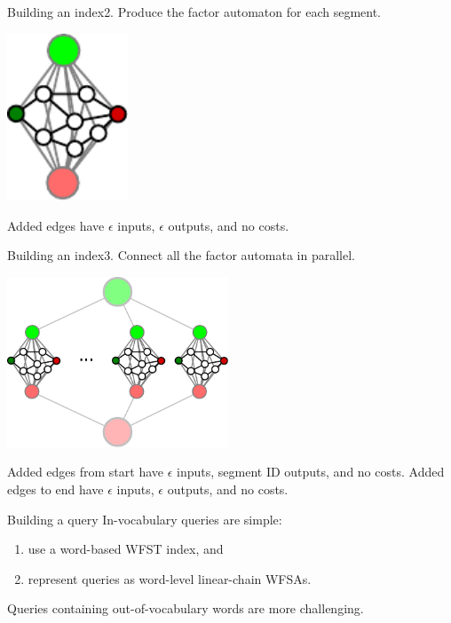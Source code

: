 \begin{frame}{Building an index}{2. Produce the factor automaton for each segment.}
  \begin{center}
    \includegraphics[width=36mm]{figures/factor}
    \end{center}
  \vfill
  Added edges have $\epsilon$ inputs, $\epsilon$ outputs, and no costs.
\end{frame}

\begin{frame}{Building an index}{3. Connect all the factor automata in parallel.}
  \begin{center}
    \includegraphics[width=66mm]{figures/index}
    \end{center}
  \vfill
  Added edges from start have $\epsilon$ inputs, segment ID outputs, and no costs.
  Added edges to end have $\epsilon$ inputs, $\epsilon$ outputs, and no costs.
\end{frame}

\begin{frame}{Building a query}{}
  In-vocabulary queries are simple:
  \begin{enumerate}
  \item use a word-based WFST index, and
  \item represent queries as word-level linear-chain WFSAs.
  \end{enumerate}
  \vfill
  Queries containing \alert{out-of-vocabulary} words are more challenging.
\end{frame}


